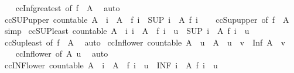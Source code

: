 \begin{isabellebody}
%
\isadelimproof
\ \ %
\endisadelimproof
%
\isatagproof
{}\isamarkupfalse%
\ ccInf{\isacharunderscore}greatest\ {\isacharbrackleft}of\ {\isachardoublequoteopen}f\ {\isacharbackquote}\ A{\isachardoublequoteclose}{\isacharbrackright}\ \isamarkupfalse%
\ auto%
\endisatagproof
{\isafoldproof}%
%
\isadelimproof
\isanewline
%
\endisadelimproof
\isanewline
{}\isamarkupfalse%
\ ccSUP{\isacharunderscore}upper{\isacharcolon}\ {\isachardoublequoteopen}countable\ A\ {\isasymLongrightarrow}\ i\ {\isasymin}\ A\ {\isasymLongrightarrow}\ f\ i\ {\isasymle}\ {\isacharparenleft}SUP\ i\ {\isasymin}\ A{\isachardot}\ f\ i{\isacharparenright}{\isachardoublequoteclose}\isanewline
%
\isadelimproof
\ \ %
\endisadelimproof
%
\isatagproof
{}\isamarkupfalse%
\ ccSup{\isacharunderscore}upper\ {\isacharbrackleft}of\ {\isachardoublequoteopen}f\ {\isacharbackquote}\ A{\isachardoublequoteclose}{\isacharbrackright}\ \isamarkupfalse%
\ simp%
\endisatagproof
{\isafoldproof}%
%
\isadelimproof
\isanewline
%
\endisadelimproof
\isanewline
{}\isamarkupfalse%
\ ccSUP{\isacharunderscore}least{\isacharcolon}\ {\isachardoublequoteopen}countable\ A\ {\isasymLongrightarrow}\ {\isacharparenleft}{\isasymAnd}i{\isachardot}\ i\ {\isasymin}\ A\ {\isasymLongrightarrow}\ f\ i\ {\isasymle}\ u{\isacharparenright}\ {\isasymLongrightarrow}\ {\isacharparenleft}SUP\ i\ {\isasymin}\ A{\isachardot}\ f\ i{\isacharparenright}\ {\isasymle}\ u{\isachardoublequoteclose}\isanewline
%
\isadelimproof
\ \ %
\endisadelimproof
%
\isatagproof
{}\isamarkupfalse%
\ ccSup{\isacharunderscore}least\ {\isacharbrackleft}of\ {\isachardoublequoteopen}f\ {\isacharbackquote}\ A{\isachardoublequoteclose}{\isacharbrackright}\ \isamarkupfalse%
\ auto%
\endisatagproof
{\isafoldproof}%
%
\isadelimproof
\isanewline
%
\endisadelimproof
\isanewline
{}\isamarkupfalse%
\ ccInf{\isacharunderscore}lower{}{\isacharcolon}\ {\isachardoublequoteopen}countable\ A\ {\isasymLongrightarrow}\ u\ {\isasymin}\ A\ {\isasymLongrightarrow}\ u\ {\isasymle}\ v\ {\isasymLongrightarrow}\ Inf\ A\ {\isasymle}\ v{\isachardoublequoteclose}\isanewline
%
\isadelimproof
\ \ %
\endisadelimproof
%
\isatagproof
{}\isamarkupfalse%
\ ccInf{\isacharunderscore}lower\ {\isacharbrackleft}of\ A\ u{\isacharbrackright}\ \isamarkupfalse%
\ auto%
\endisatagproof
{\isafoldproof}%
%
\isadelimproof
\isanewline
%
\endisadelimproof
\isanewline
{}\isamarkupfalse%
\ ccINF{\isacharunderscore}lower{}{\isacharcolon}\ {\isachardoublequoteopen}countable\ A\ {\isasymLongrightarrow}\ i\ {\isasymin}\ A\ {\isasymLongrightarrow}\ f\ i\ {\isasymle}\ u\ {\isasymLongrightarrow}\ {\isacharparenleft}INF\ i\ {\isasymin}\ A{\isachardot}\ f\ i{\isacharparenright}\ {\isasymle}\ u{\isachardoublequoteclose}\isanewline

\end{isabellebody}
